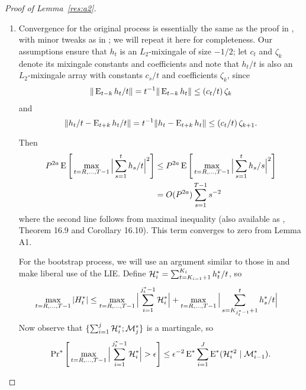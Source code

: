 \documentclass[12pt,fleqn]{article}
\begin{document}
\begin{proof}[Proof of Lemma~\ref{res:a2}]
  \begin{enumerate}
  \item Convergence for the original process is essentially the same
    as the proof in \citet{Wes:96}, with minor tweaks as in
    \citet{Cal:15}; we will repeat it here for completeness. Our
    assumptions ensure that $h_t$ is an $L_2$-mixingale of size $-1/2$;
    let $c_t$ and $\zeta_k$ denote its mixingale constants and
    coefficients and note that $h_t/t$ is also an $L_2$-mixingale array
    with constants $c_s/t$ and coefficients $\zeta_k$, since
    \begin{align*}
      \| \operatorname{E}_{t-k} h_t / t \| = t^{-1} \| \operatorname{E}_{t-k} h_t \| \leq (c_t/t)\, \zeta_k
    \end{align*}
    and
    \begin{equation*}
      \| h_t/t - \operatorname{E}_{t+k} h_t/t \| = t^{-1} \|  h_t - \operatorname{E}_{t+k} h_t \| \leq (c_t/t)\, \zeta_{k+1}.
    \end{equation*}

    Then
    \begin{align*}
      P^{2a} \operatorname{E}\Bigg[\max_{t=R,\dots,T-1} \Big| \sum_{s=1}^t h_s/t \Big|^2\Bigg]
      &\leq P^{2a} \operatorname{E}\Bigg[\max_{t=R,\dots,T-1} \Big| \sum_{s=1}^t h_s/s \Big|^2\Bigg] \\
      &= O(P^{2a}) \sum_{s=1}^{T-1} s^{-2}
    \end{align*}
    where the second line follows from  maximal
    inequality (also available as \citealp{Dav:94}, Theorem 16.9 and
    Corollary 16.10). This term converges to zero from  Lemma A1.

    For the bootstrap process, we will use an argument similar to
    those in \cite{Cal:14} and make liberal use of the
    LIE. Define $\mathcal{H}_i^* = \sum_{t=K_{i-1}+1}^{K_i}
    h_t^*/t$, so
    \begin{align*}
      \max_{t=R,\dots,T-1} | H_t^* |
      &\leq \max_{t=R,\dots,T-1} \Big| \sum_{i=1}^{j^*_t - 1}\mathcal{H}_i^* \Big| + \max_{t=R,\dots,T-1} \Big|\sum_{s=K_{j^*_t - 1}+1}^t h_s^*/t \Big|
    \end{align*}
    Now observe that $\{\sum_{i=1}^j \mathcal{H}_i^*; \mathcal{M}_j^*\}$ is a martingale, so
    \begin{equation*}
      \operatorname{Pr}^*\Bigg[ \max_{t=R,\dots,T-1} \Big| \sum_{i=1}^{j^*_t - 1}\mathcal{H}_i^* \Big| > \epsilon \Bigg]
      \leq \epsilon^{-2} \operatorname{E}^* \sum_{i=1}^J \operatorname{E}^*(\mathcal{H}_i^{*2} \mid \mathcal{M}_{i-1}^*).
    \end{equation*}


\end{enumerate}
\end{proof}
\end{document}
